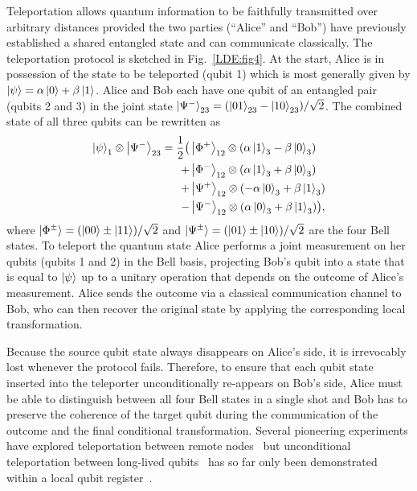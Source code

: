 Teleportation allows quantum information to be faithfully transmitted over arbitrary distances provided the two parties (``Alice'' and ``Bob'') have previously established a shared entangled state and can communicate classically.
The teleportation protocol is sketched in Fig.~\ref{LDE:fig4}. At the start, Alice is in possession of the state to be teleported (qubit 1) which is most generally given by $\left|\psi\right\rangle = \alpha\left|0\right\rangle + \beta\left|1\right\rangle$. Alice and Bob each have one qubit of an entangled pair (qubits 2 and 3) in the joint state $\left|\Psi^-\right\rangle_{23} = (\left|01\right\rangle_{23} - \left|10\right\rangle_{23})/\sqrt2$. The combined state of all three qubits can be rewritten as
\begin{align}
    \left|\psi\right\rangle_1 \otimes \left|\Psi^-\right\rangle_{23} = \frac{1}{2} \big( 
        & \left|\Phi^+\right\rangle_{12} \otimes (\alpha\left|1\right\rangle_3 - \beta\left|0\right\rangle_3) \nonumber\\
        + & \left|\Phi^-\right\rangle_{12} \otimes (\alpha\left|1\right\rangle_3 + \beta\left|0\right\rangle_3) \nonumber\\
        + & \left|\Psi^+\right\rangle_{12} \otimes (- \alpha\left|0\right\rangle_3 + \beta\left|1\right\rangle_3) \nonumber\\
        - & \left|\Psi^-\right\rangle_{12} \otimes (\alpha\left|0\right\rangle_3 + \beta\left|1\right\rangle_3)
        \big),
\end{align}
where $\left|\Phi^\pm\right\rangle = (\left|00\right\rangle\pm\left|11\right\rangle)/\sqrt2$ and $\left|\Psi^\pm\right\rangle = (\left|01\right\rangle\pm\left|10\right\rangle)/\sqrt2$ are the four Bell states. To teleport the quantum state Alice performs a joint measurement on her qubits (qubits 1 and 2) in the Bell basis, projecting Bob's qubit into a state that is equal to $\left|\psi\right\rangle$ up to a unitary operation that depends on the outcome of Alice's measurement. Alice sends the outcome via a classical communication channel to Bob, who can then recover the original state by applying the corresponding local transformation.

Because the source qubit state always disappears on Alice's side, it is irrevocably lost whenever the protocol fails. Therefore, to ensure that each qubit state inserted into the teleporter unconditionally re-appears on Bob's side, Alice must be able to distinguish between all four Bell states in a single shot and Bob has to preserve the coherence of the target qubit during the communication of the outcome and the final conditional transformation. Several pioneering experiments have explored teleportation between remote nodes~\cite{Olmschenk_Science_2009,Nolleke_Phys.Rev.Lett._2013,Krauter_NatPhys_2013} but unconditional teleportation between long-lived qubits~\cite{Awschalom_Science_2013,Devoret_Science_2013,Monroe_Science_2013} has so far only been demonstrated within a local qubit register~\cite{Riebe_Nature_2004,Barrett_Nature_2004,Steffen_Nature_2013}.

